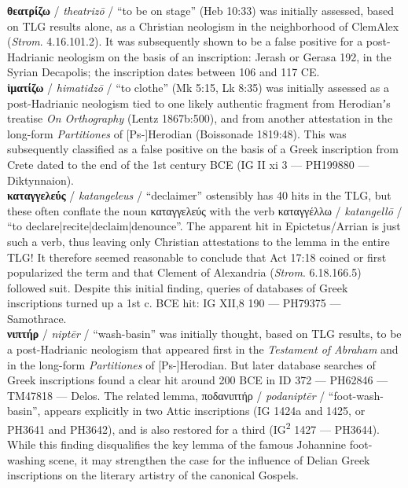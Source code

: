 \noindent{}\textbf{θεατρίζω} / \textit{theatrizō} / “to be on stage” (Heb 10:33) %
was initially assessed, based on TLG results alone, %
as a Christian neologism in the neighborhood of ClemAlex (\textit{Strom}. 4.16.101.2). %
It was subsequently shown to be a false positive for a post-Hadrianic neologism %
on the basis of an inscription: Jerash or Gerasa 192, %
in the Syrian Decapolis; %
the inscription dates between 106 and 117 CE. \\[1mm] %

\noindent{}\textbf{ἱματίζω} / \textit{himatidzō} / “to clothe” (Mk 5:15, Lk 8:35) %
was initially assessed as a post-Hadrianic neologism tied to one likely authentic %
fragment from Herodianʼs treatise \textit{On Orthography} (Lentz 1867b:500), %
and from another attestation in the long-form \textit{Partitiones} of [Ps-]Herodian (Boissonade 1819:48). %
This was subsequently classified as a false positive %
on the basis of a Greek inscription from Crete dated to the end of the 1st century BCE %
(IG II xi 3 — PH199880 — Diktynnaion). \\[1mm] %

\noindent{}\textbf{καταγγελεύς} / \textit{katangeleus} / “declaimer” ostensibly %
has 40 hits in the TLG, but these often conflate the noun καταγγελεύς with %
the verb καταγγέλλω / \textit{katangellō} / “to declare|recite|declaim|denounce”. %
The apparent hit in Epictetus/Arrian is just such a verb, %
thus leaving only Christian attestations to the lemma in the entire TLG! %
It therefore seemed reasonable to conclude that Act 17:18 coined or first popularized the term %
and that Clement of Alexandria (\textit{Strom}. 6.18.166.5) followed suit. %
Despite this initial finding, queries of databases of Greek inscriptions %
turned up a 1st c. BCE hit: IG XII,8 190 — PH79375 — Samothrace. \\[1mm] %

\noindent{}\textbf{νιπτήρ} / \textit{niptēr} / “wash-basin” %
was initially thought, based on TLG results, to be a post-Hadrianic neologism %
that appeared first in the \textit{Testament of Abraham} %
and in the long-form \textit{Partitiones} of [Ps-]Herodian. %
But later database searches of Greek inscriptions %
found a clear hit around 200 BCE in ID 372 — PH62846 — TM47818 — Delos. %
The related lemma, ποδανιπτήρ / \textit{podaniptēr} / “foot-wash-basin”, %
appears explicitly in two Attic inscriptions (IG 1424a and 1425, or PH3641 and PH3642),
and is also restored for a third (IG\textsuperscript{2} 1427 — PH3644). %
While this finding disqualifies the key lemma %
of the famous Johannine foot-washing scene, %
it may strengthen the case for the influence of Delian Greek inscriptions on the literary artistry %
of the canonical Gospels. \\[1mm] %

